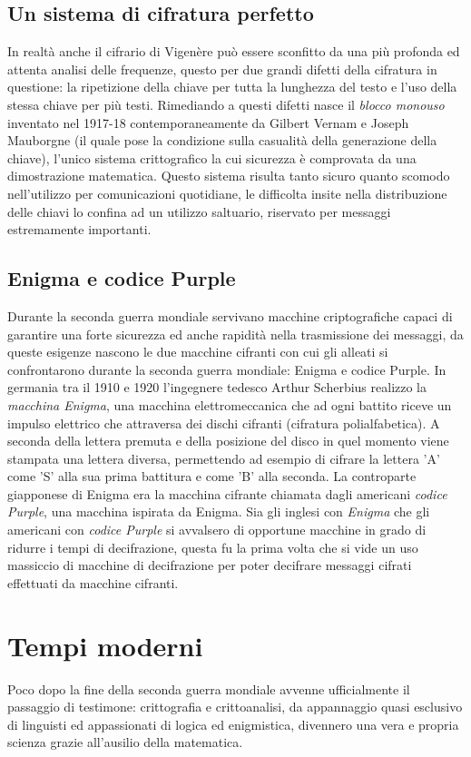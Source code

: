 \documentclass[a4paper, 12pt]{article}
\begin{document}
\subsection{Un sistema di cifratura perfetto}
In realtà anche il cifrario di Vigenère può essere sconfitto da una più profonda ed attenta analisi delle frequenze, questo per due grandi difetti della cifratura in questione: la ripetizione della chiave per tutta la lunghezza del testo e l'uso della stessa chiave per più testi.\newline
Rimediando a questi difetti nasce il \textit{blocco monouso} inventato nel 1917-18 contemporaneamente da Gilbert Vernam e Joseph Mauborgne (il quale pose la condizione sulla casualità della generazione della chiave), l'unico sistema crittografico la cui sicurezza è comprovata da una dimostrazione matematica. Questo sistema risulta tanto sicuro quanto scomodo nell'utilizzo per comunicazioni quotidiane, le difficolta insite nella distribuzione delle chiavi lo confina ad un utilizzo saltuario, riservato per messaggi estremamente importanti.
\subsection{Enigma e codice Purple}
Durante la seconda guerra mondiale servivano macchine criptografiche capaci di garantire una forte sicurezza ed anche rapidità nella trasmissione dei messaggi, da queste esigenze nascono le due macchine cifranti con cui gli alleati si confrontarono durante la seconda guerra mondiale: Enigma e codice Purple.
In germania tra il 1910 e 1920 l'ingegnere tedesco Arthur Scherbius realizzo la \textit{macchina Enigma}, una macchina elettromeccanica che ad ogni battito riceve un impulso elettrico che attraversa dei dischi cifranti (cifratura polialfabetica). A seconda della lettera premuta e della posizione del disco in quel momento viene stampata una lettera diversa, permettendo ad esempio di cifrare la lettera 'A' come 'S' alla sua prima battitura e come 'B' alla seconda.
La controparte giapponese di Enigma era la macchina cifrante chiamata dagli americani \textit{codice Purple}, una macchina ispirata da Enigma.\newline
Sia gli inglesi con \textit{Enigma} che gli americani con \textit{codice Purple} si avvalsero di opportune macchine in grado di ridurre i tempi di decifrazione, questa fu la prima volta che si vide un uso massiccio di macchine di decifrazione per poter decifrare messaggi cifrati effettuati da macchine cifranti.
\section{Tempi moderni}
Poco dopo la fine della seconda guerra mondiale avvenne ufficialmente il passaggio di testimone: crittografia e crittoanalisi, da appannaggio quasi esclusivo di linguisti ed appassionati di logica ed enigmistica, divennero una vera e propria scienza grazie all'ausilio della matematica.
\end{document}

